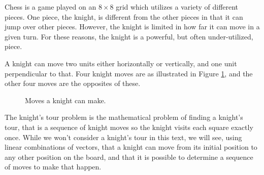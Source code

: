  \label{sec:vector_representation}

\vspace*{-17 pt}

\vspace*{13 pt}


Chess is a game played on an $8 \times 8$ grid which utilizes a variety of different pieces. One piece, the knight, is different from the other pieces in that it can jump over other pieces. However, the knight is limited in how far it can move in a given turn. For these reasons, the knight is a powerful, but often under-utilized, piece. 

A knight can move two units either horizontally or vertically, and one unit perpendicular to that. Four knight moves are  as illustrated in Figure \ref{F:knight_1}, and the other four moves are the opposites of these. 
\begin{figure}[h]
\begin{center}
\caption{Moves a knight can make.}
\label{F:knight_1}
\end{center}
\end{figure}

The knight's tour problem is the mathematical problem of finding a knight's tour, that is a sequence of knight moves so the knight visits each square exactly once. While we won't consider a knight's tour in this text, we will see, using linear combinations of vectors, that a knight can move from its initial position to any other position on the board, and that it is possible to determine a sequence of moves to make that happen.

